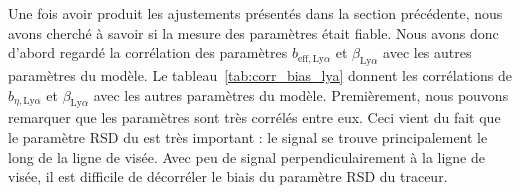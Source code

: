 \documentclass[11pt, twoside, a4paper, openright]{report}
\begin{document}
Une fois avoir produit les ajustements présentés dans la section précédente, nous avons cherché à savoir si la mesure des paramètres \lya{} était fiable. Nous avons donc d'abord regardé la corrélation des paramètres $b_{\mathrm{eff},\mathrm{Ly}\alpha}$ et $\beta_{\mathrm{Ly}\alpha}$ avec les autres paramètres du modèle. Le tableau~\ref{tab:corr_bias_lya} donnent les corrélations de $b_{\eta,\mathrm{Ly}\alpha}$ et $\beta_{\mathrm{Ly}\alpha}$ avec les autres paramètres du modèle.
Premièrement, nous pouvons remarquer que les paramètres \lya{} sont très corrélés entre eux. Ceci vient du fait que le paramètre RSD du \lya{} est très important : le signal se trouve principalement le long de la ligne de visée. Avec peu de signal perpendiculairement à la ligne de visée, il est difficile de décorréler le biais du paramètre RSD du traceur.
\end{document}

